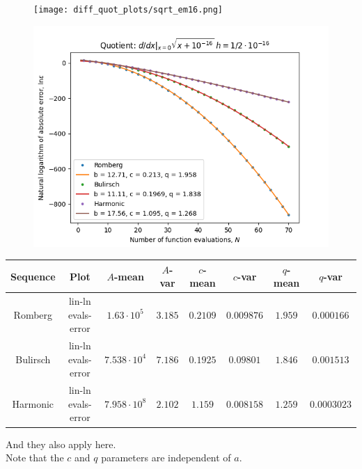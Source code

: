 \begin{figure}[H]
\centering
\begin{minipage}{0.45\textwidth}
\centering
\texttt{[image: diff\_quot\_plots/sqrt\_em16.png]}
\end{minipage}
\begin{minipage}{0.45\textwidth}
\centering
\includegraphics[scale=0.45]{diff_quot_plots/sqrt_em16_hp_trend.png}
\end{minipage}
\end{figure}

\begin{table}[H]
    \centering
    \small
    \begin{tabular}{c|c||c|c|c|c|c|c}
Sequence & Plot & \(A\)-mean & \(A\)-var & \(c\)-mean & \(c\)-var & \(q\)-mean & \(q\)-var\\\hline
Romberg & lin-ln evals-error & \(1.63\cdot 10^{5}\) & \(3.185\) & \(0.2109\) & \(0.009876\) & \(1.959\) & \(0.000166\) \\
Bulirsch & lin-ln evals-error & \(7.538\cdot 10^{4}\) & \(7.186\) & \(0.1925\) & \(0.09801\) & \(1.846\) & \(0.001513\) \\
Harmonic & lin-ln evals-error & \(7.958\cdot 10^{8}\) & \(2.102\) & \(1.159\) & \(0.008158\) & \(1.259\) & \(0.0003023\) \\
    \end{tabular}
    \label{tab:my_label}
\end{table}

And they also apply here.\\

Note that the \(c\) and \(q\) parameters are independent of \(a\).


